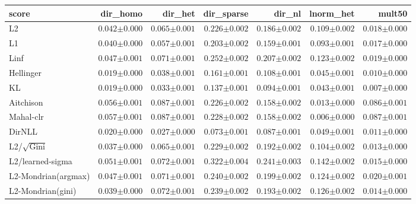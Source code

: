 \begin{tabular}{lrrrrrr}
\toprule
score & dir\_homo & dir\_het & dir\_sparse & dir\_nl & lnorm\_het & mult50 \\
\midrule
L2 & $0.042{\scriptstyle\pm0.000}$ & $0.065{\scriptstyle\pm0.001}$ & $0.226{\scriptstyle\pm0.002}$ & $0.186{\scriptstyle\pm0.002}$ & $0.109{\scriptstyle\pm0.002}$ & $0.018{\scriptstyle\pm0.000}$ \\
L1 & $0.040{\scriptstyle\pm0.000}$ & $0.057{\scriptstyle\pm0.001}$ & $0.203{\scriptstyle\pm0.002}$ & $0.159{\scriptstyle\pm0.001}$ & $0.093{\scriptstyle\pm0.001}$ & $0.017{\scriptstyle\pm0.000}$ \\
Linf & $0.047{\scriptstyle\pm0.001}$ & $0.071{\scriptstyle\pm0.001}$ & $0.252{\scriptstyle\pm0.002}$ & $0.207{\scriptstyle\pm0.002}$ & $0.123{\scriptstyle\pm0.002}$ & $0.019{\scriptstyle\pm0.000}$ \\
Hellinger & $0.019{\scriptstyle\pm0.000}$ & $0.038{\scriptstyle\pm0.001}$ & $0.161{\scriptstyle\pm0.001}$ & $0.108{\scriptstyle\pm0.001}$ & $0.045{\scriptstyle\pm0.001}$ & $0.010{\scriptstyle\pm0.000}$ \\
KL & $\mathbf{0.019}{\scriptstyle\pm0.000}$ & $0.033{\scriptstyle\pm0.001}$ & $0.137{\scriptstyle\pm0.001}$ & $0.094{\scriptstyle\pm0.001}$ & $0.043{\scriptstyle\pm0.001}$ & $\mathbf{0.007}{\scriptstyle\pm0.000}$ \\
Aitchison & $0.056{\scriptstyle\pm0.001}$ & $0.087{\scriptstyle\pm0.001}$ & $0.226{\scriptstyle\pm0.002}$ & $0.158{\scriptstyle\pm0.002}$ & $0.013{\scriptstyle\pm0.000}$ & $0.086{\scriptstyle\pm0.001}$ \\
Mahal-clr & $0.057{\scriptstyle\pm0.001}$ & $0.087{\scriptstyle\pm0.001}$ & $0.228{\scriptstyle\pm0.002}$ & $0.158{\scriptstyle\pm0.002}$ & $\mathbf{0.006}{\scriptstyle\pm0.000}$ & $0.087{\scriptstyle\pm0.001}$ \\
DirNLL & $0.020{\scriptstyle\pm0.000}$ & $\mathbf{0.027}{\scriptstyle\pm0.000}$ & $\mathbf{0.073}{\scriptstyle\pm0.001}$ & $\mathbf{0.087}{\scriptstyle\pm0.001}$ & $0.049{\scriptstyle\pm0.001}$ & $0.011{\scriptstyle\pm0.000}$ \\
L2/$\sqrt{\mathrm{Gini}}$ & $0.037{\scriptstyle\pm0.000}$ & $0.065{\scriptstyle\pm0.001}$ & $0.229{\scriptstyle\pm0.002}$ & $0.192{\scriptstyle\pm0.002}$ & $0.104{\scriptstyle\pm0.002}$ & $0.013{\scriptstyle\pm0.000}$ \\
L2/learned-sigma & $0.051{\scriptstyle\pm0.001}$ & $0.072{\scriptstyle\pm0.001}$ & $0.322{\scriptstyle\pm0.004}$ & $0.241{\scriptstyle\pm0.003}$ & $0.142{\scriptstyle\pm0.002}$ & $0.015{\scriptstyle\pm0.000}$ \\
L2-Mondrian(argmax) & $0.047{\scriptstyle\pm0.001}$ & $0.071{\scriptstyle\pm0.001}$ & $0.240{\scriptstyle\pm0.002}$ & $0.199{\scriptstyle\pm0.002}$ & $0.124{\scriptstyle\pm0.002}$ & $0.020{\scriptstyle\pm0.001}$ \\
L2-Mondrian(gini) & $0.039{\scriptstyle\pm0.000}$ & $0.072{\scriptstyle\pm0.001}$ & $0.239{\scriptstyle\pm0.002}$ & $0.193{\scriptstyle\pm0.002}$ & $0.126{\scriptstyle\pm0.002}$ & $0.014{\scriptstyle\pm0.000}$ \\
\bottomrule
\end{tabular}